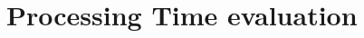 \documentclass[ExampleMasters.tex]{subfiles}
\begin{document}
\clearpage
\chapter{Processing Time evaluation}
\end{document}
